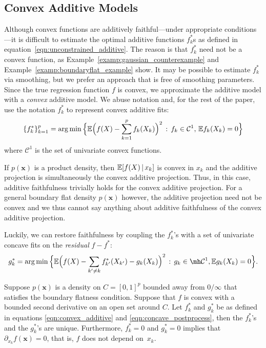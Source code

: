 \subsection{Convex Additive Models}

Although convex functions are additively faithful---under appropriate conditions---it is difficult to
estimate the optimal additive functions $f^*_k$s as defined in
equation~\eqref{eqn:unconstrained_additive}.  The reason is that $f^*_k$ need not be
a convex function, as Example~\ref{examp:gaussian_counterexample} and Example~\ref{examp:boundaryflat_example} 
show. It may be possible to estimate $f^*_k$ via smoothing, but we prefer an approach that is free of smoothing parameters. 
Since the true regression function $f$ is convex, we approximate the additive model with a \emph{convex} additive model. We abuse notation and, for the rest of the paper, use the notation $f^*_k$ to represent convex additive fits:
\begin{equation}
\label{eqn:convex_additive}
\{ f^*_k \}_{k=1}^p = \arg\min \Big \{ 
    {\mathbb E}\Bigl( f(X) - \sum_{k=1}^p f_k(X_k) \Bigr)^2 \,:\, f_k \in \mathcal{C}^1, \, {\mathbb E} f_k(X_k) = 0 \Big \}
\end{equation}
where $\mathcal{C}^1$ is the set of univariate convex functions. 

If $p(\mathbf{x})$ is a product density, then ${\mathbb E}[ f(X) {\,|\,} x_k]$ is convex in $x_k$ and the additive projection is simultaneously the convex additive projection. Thus, in this case, additive faithfulness trivially holds for the convex additive projection.  For a general boundary flat density $p(\mathbf{x})$ however, the additive projection need not be convex and we thus cannot say anything about additive faithfulness of the convex additive projection.

Luckily, we can restore faithfulness by coupling the $f^*_k$'s with a set of univariate concave fits on the \emph{residual} $f - f^*$:
\begin{equation}
\label{eqn:concave_postprocess}
g^*_k = \arg\min \Big\{
   \E\Bigl( f(X) - \sum_{k' \neq k} f^*_{k'}(X_{k'}) - g_k(X_k) \Bigr)^2
    \,:\, g_k \in \mh \mathcal{C}^1, \E g_k(X_k) = 0 
  \Big\}.
\end{equation}


\begin{theorem}
\label{thm:acdc_faithful}
Suppose $p(\mathbf{x})$ is a density on $C=[0,1]^p$ bounded away from
$0/\infty$ that satisfies the boundary flatness condition. Suppose
that $f$ is convex with a bounded second derivative on an open set
around $C$. Let $f^*_k$ and $g^*_k$ be as defined in equations
\eqref{eqn:convex_additive} and \eqref{eqn:concave_postprocess}, then
the $f^*_k$'s and the $g^*_k$'s are unique. Furthermore, $f^*_k = 0$
and $g^*_k = 0$ implies that $\partial_{x_k} f(\mathbf{x}) = 0$, that
is, $f$ does not depend on~$x_k$.
\end{theorem}

